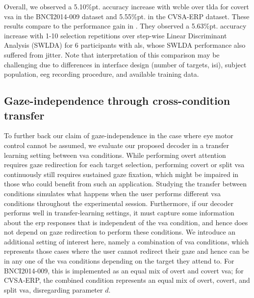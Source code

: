 Overall, we observed a 5.10\%pt. accuracy increase with \ac{wcble} over
\ac{tlda} for covert \ac{vsa} in the BNCI2014-009 dataset and 5.55\%pt. in the CVSA-ERP dataset.
These results compare to the performance gain in \cite{Zisk2022}.
They observed a 5.63\%pt. accuracy increase with 1-10 selection repetitions over
step-wise Linear Discriminant Analysis  (SWLDA) for 6 participants with
\ac{als}, whose SWLDA performance also suffered from jitter.
Note that interpretation of this comparison may be challenging due to differences in
interface design (number of targets, \ac{isi}), subject population,
\ac{eeg} recording procedure, and available training data.

\subsection{Gaze-independence through cross-condition transfer}
\label{sec:cross_results}
To further back our claim of gaze-independence in the case where eye motor
control cannot be assumed, we evaluate our proposed decoder in a transfer
learning setting between \ac{vsa} conditions.
While performing overt attention requires gaze redirection for each target
selection, performing covert or split \ac{vsa} continuously still requires
sustained gaze fixation, which might be impaired in those who
could benefit from such an application.
Studying the transfer between conditions simulates what happens
when the user performs different \ac{vsa} conditions throughout the
experimental session.
Furthermore, if our decoder performs well in transfer-learning settings,
it must capture some information about the \ac{erp} responses that is independent of
the \ac{vsa} condition, and hence does not depend on gaze redirection to perform
these conditions.
We introduce an additional setting of interest here, namely a combination of \ac{vsa}
conditions, which represents those cases where the user cannot
redirect their gaze and hence can be in any one of the \ac{vsa} conditions depending on the
target they attend to.
For BNCI2014-009, this is implemented as an equal mix of overt and
covert \ac{vsa}; for CVSA-ERP, the combined condition represents an equal mix of overt,
covert, and split \ac{vsa}, disregarding parameter $d$.

